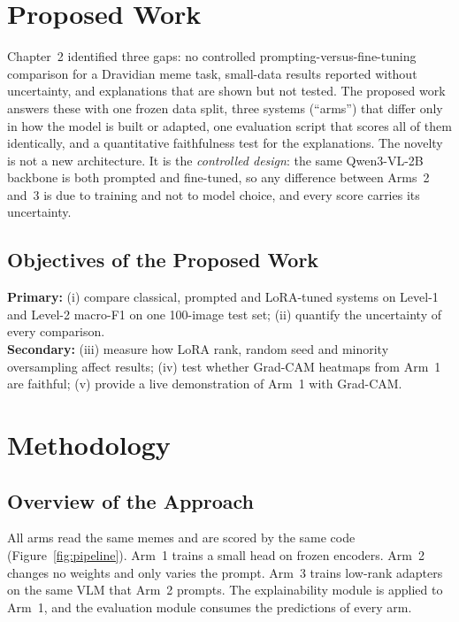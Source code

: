 \label{chap.3}
\section{Proposed Work}

Chapter~2 identified three gaps: no controlled prompting-versus-fine-tuning comparison for a Dravidian meme task, small-data results reported without uncertainty, and explanations that are shown but not tested. The proposed work answers these with one frozen data split, three systems (``arms'') that differ only in how the model is built or adapted, one evaluation script that scores all of them identically, and a quantitative faithfulness test for the explanations. The novelty is not a new architecture. It is the \emph{controlled design}: the same Qwen3-VL-2B backbone is both prompted and fine-tuned, so any difference between Arms~2 and~3 is due to training and not to model choice, and every score carries its uncertainty.

\subsection{Objectives of the Proposed Work}

\textbf{Primary:} (i) compare classical, prompted and LoRA-tuned systems on Level-1 and Level-2 macro-F1 on one 100-image test set; (ii) quantify the uncertainty of every comparison.\\
\textbf{Secondary:} (iii) measure how LoRA rank, random seed and minority oversampling affect results; (iv) test whether Grad-CAM heatmaps from Arm~1 are faithful; (v) provide a live demonstration of Arm~1 with Grad-CAM.

\section{Methodology}

\subsection{Overview of the Approach}

All arms read the same memes and are scored by the same code (Figure~\ref{fig:pipeline}). Arm~1 trains a small head on frozen encoders. Arm~2 changes no weights and only varies the prompt. Arm~3 trains low-rank adapters on the same VLM that Arm~2 prompts. The explainability module is applied to Arm~1, and the evaluation module consumes the predictions of every arm.

